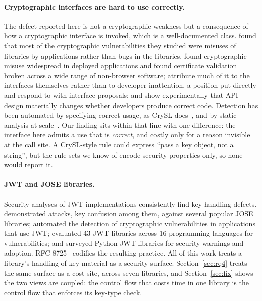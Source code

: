 \documentclass[pdflatex,sn-basic,twocolumn]{sn-jnl}%
\begin{document}
\paragraph{Cryptographic interfaces are hard to use correctly.} The defect
reported here is not a cryptographic weakness but a consequence of how a
cryptographic interface is invoked, which is a well-documented class. \citet{lazar2014why} found that most of the cryptographic vulnerabilities
they studied were misuses of libraries by applications rather than bugs in the
libraries. \citet{egele2013empirical} found cryptographic misuse
widespread in deployed applications and \citet{georgiev2012dangerous} found certificate validation broken across a
wide range of non-browser software; \citet{nadi2016jumping}
attribute much of it to the interfaces themselves rather than to developer
inattention, a position \citet{green2016developers} put directly
and \citet{indela2016helping} respond to with interface proposals;
and \citet{acar2017comparing} show experimentally that API design
materially changes whether developers produce correct code. Detection has been
automated by specifying correct usage, as CrySL does~\citep{kruger2018crysl},
and by static analysis at scale~\citep{rahaman2019cryptoguard}. Our finding sits
within that line with one difference: the interface here admits a use that is
\emph{correct}, and costly only for a reason invisible at the call site. A
CrySL-style rule could express ``pass a key object, not a string'', but the
rule sets we know of encode security properties only, so none would report it.

\paragraph{JWT and JOSE libraries.} Security analyses of JWT implementations
consistently find key-handling defects. \citet{detering2017jose} demonstrated attacks, key confusion among them,
against several popular JOSE libraries; \citet{xu2023jwtkey}
automated the detection of cryptographic vulnerabilities in applications that
use JWT; \citet{yang2026tokentimebomb} evaluated 43 JWT libraries
across 16 programming languages for vulnerabilities; and \citet{shatnawi2024python} surveyed Python JWT libraries for security
warnings and adoption. RFC 8725~\citep{rfc8725} codifies the resulting practice.
All of this work treats a library's handling of key material as a security
surface. Section~\ref{sec:rq4} treats the same surface as a cost site, across
seven libraries, and Section~\ref{sec:fix} shows the two views are coupled: the
control flow that costs time in one library is the control flow that enforces
its key-type check.
\end{document}
